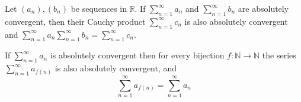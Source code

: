 \documentclass{report}
\theoremstyle{definition}
\begin{document}
\begin{seqt}
    Let $(a_n), (b_n)$ be sequences in $\mathbb{R}$. If $\sum_{n=1}^{\infty}a_n$ and $\sum_{n=1}^{\infty}b_n$ are absolutely convergent, then their Cauchy product
    $\sum_{n=1}^{\infty}c_n$ is also absolutely convergent and $\sum_{n=1}^{\infty}a_n\sum_{n=1}^{\infty}b_n=\sum_{n=1}^{\infty}c_n$.
\end{seqt}
\begin{seqt}
    If $\sum_{n=1}^{\infty}a_n$ is absolutely convergent then for every bijection $f:\mathbb{N}\to\mathbb{N}$ the series $\sum_{n=1}^{\infty}a_{f(n)}$ is also absolutely convergent, and
    \begin{equation}
        \sum_{n=1}^{\infty}a_{f(n)} = \sum_{n=1}^{\infty}a_n
    \end{equation}
\end{seqt}
\end{document}
